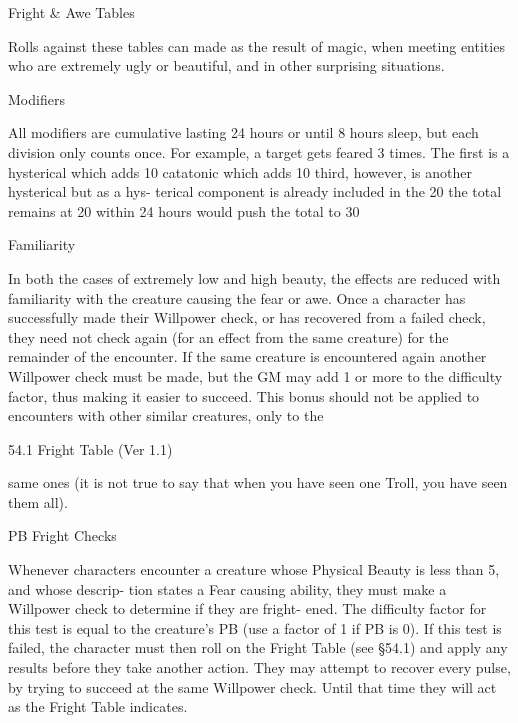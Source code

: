 \begin{Chapter}{Fright \& Awe Tables}

Rolls against these tables can made as the result of 
magic,  when  meeting  entities  who  are  extremely 
ugly or beautiful, and in other surprising situations. 

Modifiers 

All  modifiers  are  cumulative  lasting  24  hours  or 
until  8  hours  sleep,  but  each  division  only  counts 
once.  For  example,  a  target  gets  feared  3  times. 
The first is a hysterical which adds 10%
catatonic which adds 10%
third,  however,  is  another  hysterical  but  as  a  hys-
terical  component  is  already  included  in  the  20%
the  total  remains  at  20%
within 24 hours would push the total to 30%

Familiarity 

In both the cases of extremely low and high beauty, 
the  effects  are  reduced  with  familiarity  with  the 
creature  causing  the  fear  or  awe.  Once  a  character 
has  successfully  made  their  Willpower  check,  or 
has  recovered  from  a  failed  check,  they  need  not 
check again (for an effect from the same creature) 
for  the  remainder  of  the  encounter.  If  the  same 
creature  is  encountered  again  another  Willpower 
check  must  be  made,  but  the  GM  may  add  1  or 
more  to  the  difficulty  factor,  thus making  it  easier 
to  succeed.  This  bonus  should  not  be  applied  to 
encounters with other similar creatures, only to the 

54.1 Fright Table (Ver 1.1) 

same ones (it is not true to say that when you have 
seen one Troll, you have seen them all). 

PB Fright Checks 

Whenever  characters  encounter  a  creature  whose 
Physical Beauty is less than 5, and whose descrip-
tion states a Fear causing ability, they must make a 
Willpower  check  to  determine  if  they  are  fright-
ened.  The  difficulty  factor  for  this  test  is  equal  to 
the  creature’s  PB  (use  a  factor  of  1  if  PB  is  0).  If 
this  test  is  failed,  the  character  must  then  roll  on 
the  Fright  Table  (see  §54.1)  and  apply  any  results 
before they take another action. They may attempt 
to  recover  every  pulse,  by  trying  to  succeed at the 
same  Willpower  check.  Until  that  time  they  will 
act as the Fright Table indicates. 


\end{Chapter}
